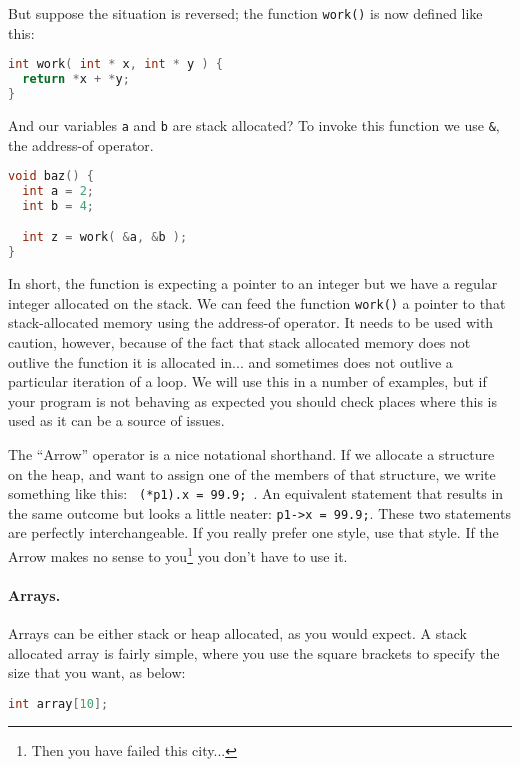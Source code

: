 But suppose the situation is reversed; the function \texttt{work()} is now defined like this:

\begin{lstlisting}[language=C]
int work( int * x, int * y ) {
  return *x + *y;
}
\end{lstlisting}

And our variables \texttt{a} and \texttt{b} are stack allocated? To invoke this function we use \texttt{\&}, the address-of operator.

\begin{lstlisting}[language=C]
void baz() {
  int a = 2;
  int b = 4;

  int z = work( &a, &b );
}
\end{lstlisting}

In short, the function is expecting a pointer to an integer but we have a regular integer allocated on the stack. We can feed the function \texttt{work()} a pointer to that stack-allocated memory using the address-of operator. It needs to be used with caution, however, because of the fact that stack allocated memory does not outlive the function it is allocated in... and sometimes does not outlive a particular iteration of a loop. We will use this in a number of examples, but if your program is not behaving as expected you should check places where this is used as it can be a source of issues.

The ``Arrow'' operator is a nice notational shorthand. If we allocate a structure on the heap, and want to assign one of the members of that structure, we write something like this: \texttt{ (*p1).x = 99.9; }. An equivalent statement that results in the same outcome but looks a little neater: \texttt{p1->x = 99.9;}. These two statements are perfectly interchangeable. If you really prefer one style, use that style. If the Arrow makes no sense to you\footnote{Then you have failed this city...} you don't have to use it.

\paragraph{Arrays.}

Arrays can be either stack or heap allocated, as you would expect. A stack allocated array is fairly simple, where you use the square brackets to specify the size that you want, as below:

\begin{lstlisting}[language=C]
int array[10];
\end{lstlisting}

